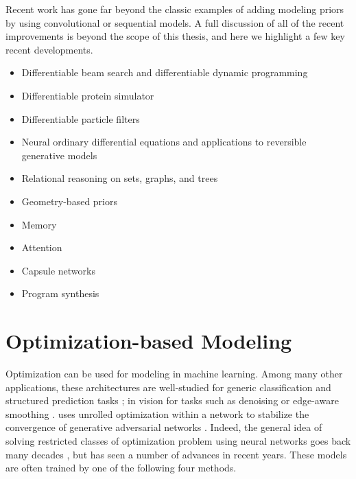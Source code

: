 Recent work has gone far beyond the classic examples of
adding modeling priors by using convolutional or
sequential models.
A full discussion of all of the
recent improvements is beyond the scope of this thesis,
and here we highlight a few key recent
developments.
\begin{itemize}
\item Differentiable beam search \citep{goyal2018continuous}
  and differentiable dynamic programming \citep{mensch2018differentiable}
\item Differentiable protein simulator \citep{ingraham2018learning}
\item Differentiable particle filters \citep{jonschkowski2018differentiable}
\item Neural ordinary differential equations \citep{chen2018neural}
  and applications to reversible generative models \citep{grathwohl2018ffjord}
\item Relational reasoning on sets, graphs, and trees
  \citep{battaglia2018relational,zaheer2017deep,
    kipf2016semi,gilmer2017neural,santoro2017simple,
    hamilton2017inductive,battaglia2016interaction,
    xu2018powerful,farquhar2017treeqn,shen2018ordered}
\item Geometry-based priors
  \citep{bronstein2017geometric,gulcehre2018hyperbolic,
     monti2017geometric,tang2018ba,li2018smoothing}
\item Memory \citep{sukhbaatar2015end,graves2014neural,graves2016hybrid,xiong2016dynamic,hill2015goldilocks,parisotto2017neural}
\item Attention \citep{bahdanau2014neural,vaswani2017attention,wang2018non}
\item Capsule networks \citep{sabour2017dynamic,hinton2018matrix,xinyi2018capsule}
\item Program synthesis
\citep{reed2015neural,neelakantan2015neural,balog2016deepcoder,devlin2017robustfill,parisotto2016neuro}
\end{itemize}

\section{Optimization-based Modeling}
\label{sec:bg:opt}
Optimization can be used for modeling in machine learning.
Among many other applications, these architectures are well-studied for
generic classification and structured prediction tasks
\citep{goodfellow2013multi,stoyanov2011empirical,brakel2013training,lecun2006tutorial,belanger2016structured,belanger2017end};
in vision for tasks such as denoising
\citep{tappen2007learning,schmidt2014shrinkage}
or edge-aware smoothing \citep{barron2016fast}.
\citet{metz2016unrolled} uses unrolled optimization within a network to
stabilize the convergence of generative adversarial networks
\citep{goodfellow2014generative}.
Indeed, the general idea of solving restricted classes of
optimization problem using neural networks goes back
many decades \citep{kennedy1988neural, lillo1993solving},
but has seen a number of advances in recent years.
These models are often trained by one of
the following four methods.

